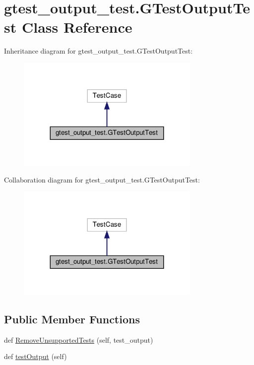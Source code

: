 \hypertarget{classgtest__output__test_1_1_g_test_output_test}{}\section{gtest\+\_\+output\+\_\+test.\+G\+Test\+Output\+Test Class Reference}
\label{classgtest__output__test_1_1_g_test_output_test}


Inheritance diagram for gtest\+\_\+output\+\_\+test.\+G\+Test\+Output\+Test\+:
\nopagebreak
\begin{figure}[H]
\begin{center}
\leavevmode
\includegraphics[width=251pt]{classgtest__output__test_1_1_g_test_output_test__inherit__graph}
\end{center}
\end{figure}


Collaboration diagram for gtest\+\_\+output\+\_\+test.\+G\+Test\+Output\+Test\+:
\nopagebreak
\begin{figure}[H]
\begin{center}
\leavevmode
\includegraphics[width=251pt]{classgtest__output__test_1_1_g_test_output_test__coll__graph}
\end{center}
\end{figure}
\subsection*{Public Member Functions}
\begin{DoxyCompactItemize}
\item 
def \hyperlink{classgtest__output__test_1_1_g_test_output_test_a63f62268f795adfc5ca91514dbec2873}{Remove\+Unsupported\+Tests} (self, test\+\_\+output)
\item 
def \hyperlink{classgtest__output__test_1_1_g_test_output_test_a1e6b96f68c5bcb8271de3208fa7f9f64}{test\+Output} (self)
\end{DoxyCompactItemize}


